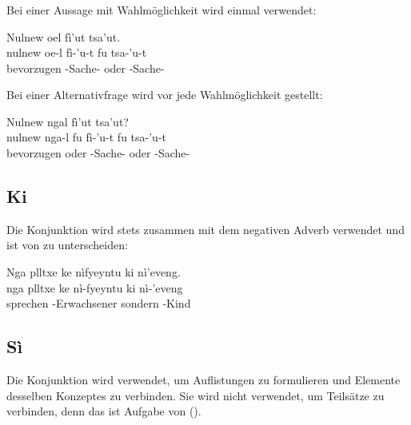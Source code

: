\subsubsection{} Bei einer Aussage mit Wahlmöglichkeit wird  einmal verwendet: 

\begin{interlin}
	\glll \Npawl{}Nulnew oel fì'ut  tsa'ut. \\
	nulnew oe-l fì-'u-t fu tsa-'u-t \\
	bevorzugen  -Sache- oder -Sache- \\
\end{interlin}

\noindent Bei einer Alternativfrage wird  vor jede Wahlmöglichkeit gestellt:

\begin{interlin}
	\glll \Npawl{}Nulnew ngal  fì'ut  tsa'ut? \\
	nulnew nga-l fu fì-'u-t fu tsa-'u-t \\
	bevorzugen  oder -Sache- oder -Sache- \\
\end{interlin}

\subsection{Ki} Die Konjunktion   wird stets zusammen mit dem negativen Adverb  verwendet und ist von   zu unterscheiden:

\begin{interlin}
	\glll \Npawl{}Nga plltxe ke nìfyeyntu ki nì'eveng. \\
	nga plltxe ke nì-fyeyntu ki nì-'eveng \\
	 sprechen  -Erwachsener sondern -Kind \\
\end{interlin}

\subsection{Sì} Die Konjunktion   wird verwendet, um Auflistungen zu formulieren und Elemente desselben Konzeptes zu verbinden. Sie wird nicht verwendet, um Teilsätze zu verbinden, denn das ist Aufgabe von  (). \label{syn:sì}

